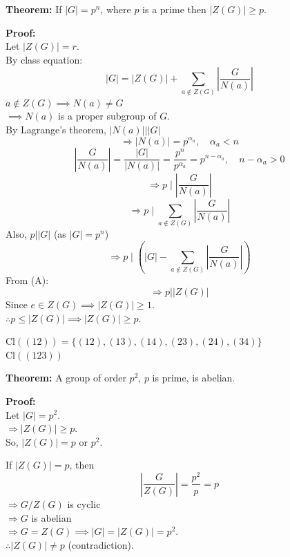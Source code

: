 \documentclass[11pt]{article}
\begin{document}
\noindent \textbf{Theorem:} If $\vert{}G\vert{} = p^n$, where $p$ is a prime then $\vert{}Z(G)\vert{} \ge p$.

\medskip
\noindent \textbf{Proof:} \\
Let $\vert{}Z(G)\vert{} = r$. \\
By class equation:
\[\vert{}G\vert{} = \vert{}Z(G)\vert{} + \sum_{a \notin Z(G)} \left\vert{}\frac{G}{N(a)}\right\vert{} \tag{A}\]
$a \notin Z(G) \implies N(a) \ne G$ \\
$\implies N(a)$ is a proper subgroup of $G$. \\
By Lagrange's theorem, $\vert{}N(a)\vert{} \mid \vert{}G\vert{}$
\[\Rightarrow \vert{}N(a)\vert{} = p^{\alpha_a}, \quad \alpha_a < n\]
\[\left\vert{}\frac{G}{N(a)}\right\vert{} = \frac{\vert{}G\vert{}}{\vert{}N(a)\vert{}} = \frac{p^n}{p^{\alpha_a}} = p^{n - \alpha_a}, \quad n - \alpha_a > 0\]
\[\Rightarrow p  \mid  \left\vert{}\frac{G}{N(a)}\right\vert{}\]
\[\Rightarrow p  \mid  \sum_{a \notin Z(G)} \left\vert{}\frac{G}{N(a)}\right\vert{}\]
Also, $p \mid \vert{}G\vert{}$ (as $\vert{}G\vert{} = p^n$)
\[\Rightarrow p  \mid  \left(\vert{}G\vert{} - \sum_{a \notin Z(G)} \left\vert{}\frac{G}{N(a)}\right\vert{}\right)\]
From (A):
\[\Rightarrow p \mid \vert{}Z(G)\vert{}\]
Since $e \in Z(G) \implies \vert{}Z(G)\vert{} \ge 1$. \\
$\therefore p \le \vert{}Z(G)\vert{} \implies \vert{}Z(G)\vert{} \ge p$.

\bigskip
\noindent $\text{Cl}((12)) = \{(12), (13), (14), (23), (24), (34)\}$ \\
$\text{Cl}((123))$

\newpage
\noindent \textbf{Theorem:} A group of order $p^2$, $p$ is prime, is abelian.

\medskip
\noindent \textbf{Proof:} \\
Let $\vert{}G\vert{} = p^2$. \\
$\Rightarrow \vert{}Z(G)\vert{} \ge p$. \\
So, $\vert{}Z(G)\vert{} = p$ or $p^2$.

\noindent If $\vert{}Z(G)\vert{} = p$, then
\[\left\vert{}\frac{G}{Z(G)}\right\vert{} = \frac{p^2}{p} = p\]
$\Rightarrow G/Z(G)$ is cyclic \\
$\Rightarrow G$ is abelian \\
$\Rightarrow G = Z(G) \implies \vert{}G\vert{} = \vert{}Z(G)\vert{} = p^2$. \\
$\therefore \vert{}Z(G)\vert{} \ne p$ (contradiction).
\end{document}
